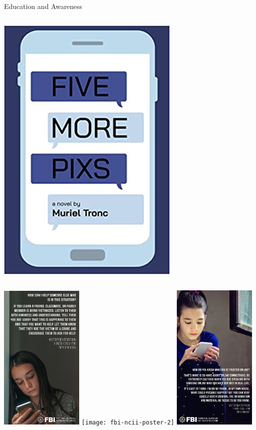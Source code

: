 \documentclass[nobackground,dvipsnames,table,aspectratio=169]{beamer}
\begin{document}
\begin{frame}{Education and Awareness}
\begin{columns}
            \includegraphics[height=0.8\textheight]{five-more-pixs}
    \end{columns}
\end{frame}

\begin{frame}{}
    \includegraphics[width=0.3\textwidth]{fbi-ncii-poster-1}
    \texttt{[image: fbi-ncii-poster-2]}
    \includegraphics[width=0.3\textwidth]{fbi-ncii-poster-3}
\end{frame}
\end{document}
